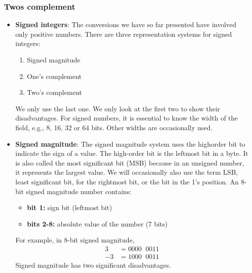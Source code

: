 \documentclass{report}
\begin{document}
    \subsubsection{Twos complement}
    \begin{itemize}
        \item \textbf{Signed integers}: The conversions we have so far presented have involved only positive numbers.
            \bigbreak \noindent 
            There are three representation systems for signed integers:
            \begin{enumerate}
                \item Signed magnitude
                \item One’s complement
                \item Two’s complement
            \end{enumerate}
            We only use the last one. We only look at the first two to show their disadvantages.
            \bigbreak \noindent 
            For signed numbers, it is essential to know the width of the field, e.g., 8, 16, 32 or 64 bits. Other widths are occasionally used.
        \item \textbf{Signed magnitude}: The signed magnitude system uses the highorder bit to indicate the sign of a value.
            \bigbreak \noindent 
            The high-order bit is the leftmost bit in a byte.
            \bigbreak \noindent 
            It is also called the most significant bit (MSB) because in an unsigned number, it represents the largest value.
            \bigbreak \noindent 
            We will occasionally also use the term LSB, least significant bit, for the rightmost bit, or the bit in the 1’s position.
            \bigbreak \noindent 
            An 8-bit signed magnitude number contains:
            \begin{itemize}
                \item \textbf{bit 1:} sign bit (leftmost bit)
                \item \textbf{bits 2-8:} absolute value of the number (7 bits)
            \end{itemize}
            \bigbreak \noindent 
            For example, in 8-bit signed magnitude,
            \begin{align*}
                3 &= 0000 \;\; 0011 \\
                -3 &= 1000 \;\; 0011 
            \end{align*}
            \bigbreak \noindent 
            Signed magnitude has two significant disadvantages.

\end{itemize}
\end{document}
